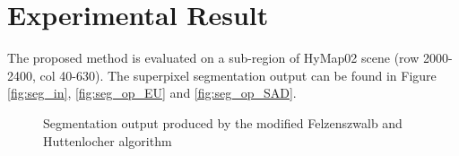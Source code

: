\documentclass[12pt,twoside]{article}
\theoremstyle{plain}
\theoremstyle{definition}
\theoremstyle{remark}
\begin{document}
\section{Experimental Result}
\label{sec:experiment}
The proposed method is evaluated on a sub-region of HyMap02 scene (row 2000-2400, col 40-630). The superpixel segmentation output can be found in Figure \ref{fig:seg_in}, \ref{fig:seg_op_EU} and \ref{fig:seg_op_SAD}.

\begin{figure}[htbp]
\centering     %
{}
\caption{Segmentation output produced by the modified Felzenszwalb and Huttenlocher algorithm}
\end{figure}
\end{document}
